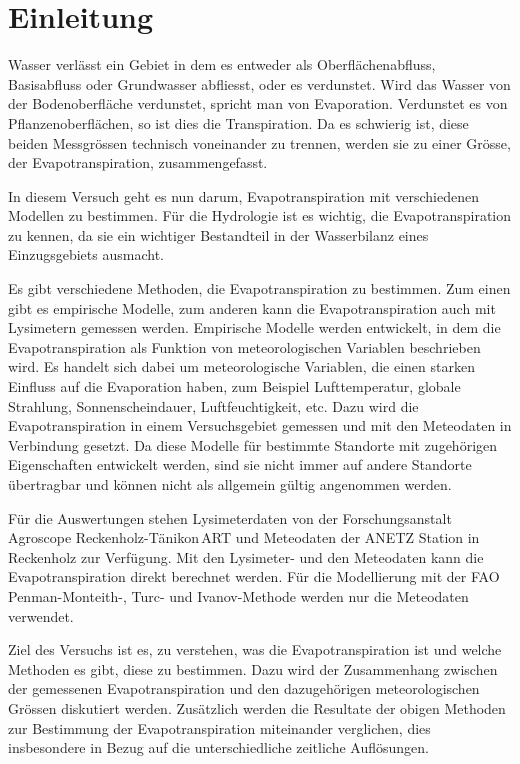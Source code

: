 \section{Einleitung}

Wasser verlässt ein Gebiet in dem es entweder als Oberflächenabfluss, Basisabfluss oder Grundwasser abfliesst, oder es verdunstet. Wird das Wasser von der Bodenoberfläche verdunstet, spricht man von Evaporation. Verdunstet es von Pflanzenoberflächen, so ist dies die Transpiration. Da es schwierig ist, diese beiden Messgrössen technisch voneinander zu trennen, werden sie zu einer Grösse, der Evapotranspiration, zusammengefasst.

In diesem Versuch geht es nun darum, Evapotranspiration mit verschiedenen Modellen zu bestimmen. Für die Hydrologie ist es wichtig, die Evapotranspiration zu kennen, da sie ein wichtiger Bestandteil in der Wasserbilanz eines Einzugsgebiets ausmacht.

Es gibt verschiedene Methoden, die Evapotranspiration zu bestimmen. Zum einen gibt es empirische Modelle, zum anderen kann die Evapotranspiration auch mit Lysimetern gemessen werden. Empirische Modelle werden entwickelt, in dem die Evapotranspiration als Funktion von meteorologischen Variablen beschrieben wird. Es handelt sich dabei um meteorologische Variablen, die einen starken Einfluss auf die Evaporation haben, zum Beispiel Lufttemperatur, globale Strahlung, Sonnenscheindauer, Luftfeuchtigkeit, etc. Dazu wird die Evapotranspiration in einem Versuchsgebiet gemessen und mit den Meteodaten in Verbindung gesetzt. Da diese Modelle für bestimmte Standorte mit zugehörigen Eigenschaften entwickelt werden, sind sie nicht immer auf andere Standorte übertragbar und können nicht als allgemein gültig angenommen werden.

Für die Auswertungen stehen Lysimeterdaten von der Forschungsanstalt Agroscope Reckenholz-Tänikon\,ART und Meteodaten der ANETZ Station in Reckenholz zur Verfügung. Mit den Lysimeter- und den Meteodaten kann die Evapotranspiration direkt berechnet werden. Für die Modellierung mit der FAO\,Penman-Monteith-, Turc- und Ivanov-Methode werden nur die Meteodaten verwendet.

Ziel des Versuchs ist es, zu verstehen, was die Evapotranspiration ist und welche Methoden es gibt, diese zu bestimmen. Dazu wird der Zusammenhang zwischen der gemessenen Evapotranspiration und den dazugehörigen meteorologischen Grössen diskutiert werden. Zusätzlich werden die Resultate der obigen Methoden zur Bestimmung der Evapotranspiration miteinander verglichen, dies insbesondere in Bezug auf die unterschiedliche zeitliche Auflösungen.